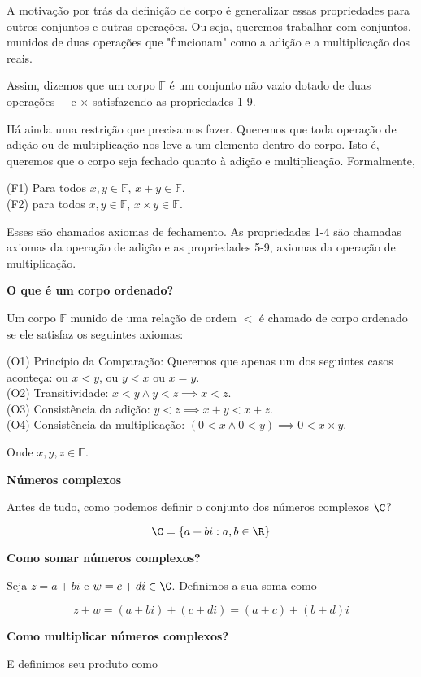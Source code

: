 \documentclass[
]{article}
\begin{document}
A motivação por trás da definição de corpo é generalizar essas
propriedades para outros conjuntos e outras operações. Ou seja, queremos
trabalhar com conjuntos, munidos de duas operações que "funcionam" como
a adição e a multiplicação dos reais.

Assim, dizemos que um corpo \(\mathbb{F}\) é um conjunto não vazio
dotado de duas operações \(+\) e \(\times\) satisfazendo as propriedades
1-9.

Há ainda uma restrição que precisamos fazer. Queremos que toda operação
de adição ou de multiplicação nos leve a um elemento dentro do corpo.
Isto é, queremos que o corpo seja fechado quanto à adição e
multiplicação. Formalmente,

(F1) Para todos \(x,y \in \mathbb{F}\), \(x+y \in \mathbb{F}\).\\
(F2) para todos \(x,y \in \mathbb{F}\), \(x \times y \in \mathbb{F}\).

Esses são chamados axiomas de fechamento. As propriedades 1-4 são
chamadas axiomas da operação de adição e as propriedades 5-9, axiomas da
operação de multiplicação.

\textbf{O que é um corpo ordenado?}

Um corpo \(\mathbb{F}\) munido de uma relação de ordem \(<\) é chamado
de corpo ordenado se ele satisfaz os seguintes axiomas:

(O1) Princípio da Comparação: Queremos que apenas um dos seguintes casos
aconteça: ou \(x<y\), ou \(y<x\) ou \(x=y\).\\
(O2) Transitividade: \(x < y \land y < z \implies x < z\).\\
(O3) Consistência da adição: \(y < z \implies x+y < x + z\).\\
(O4) Consistência da multiplicação:
\((0 < x \land 0 < y) \implies 0 < x \times y\).

Onde \(x, y, z \in \mathbb{F}\).

\textbf{Números complexos}

Antes de tudo, como podemos definir o conjunto dos números complexos
\(\C\)?

\[\C = \{ a+bi : a, b \in \R \}\]

\textbf{Como somar números complexos?}

Seja \(z = a + bi\) e \(w = c+di \in \C\). Definimos a sua soma como

\[z+w = (a+bi) + (c+di) = (a+c)+(b+d)i\]

\textbf{Como multiplicar números complexos?}

E definimos seu produto como
\end{document}

